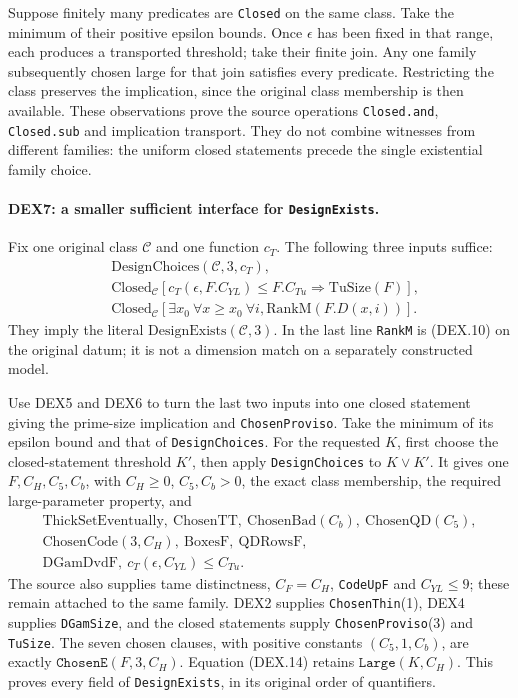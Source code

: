 \documentclass[11pt,a4paper]{article}
\numberwithin{equation}{section}
\theoremstyle{remark}\newtheorem{remark}[theorem]{Remark}
\begin{document}
Suppose finitely many predicates are \texttt{Closed} on the same
class. Take the minimum of their positive epsilon bounds. Once
$\epsilon$ has been fixed in that range, each produces a transported
threshold; take their finite join. Any one family subsequently chosen
large for that join satisfies every predicate. Restricting the class
preserves the implication, since the original class membership is
then available. These observations prove the source operations
\texttt{Closed.and}, \texttt{Closed.sub} and implication transport.
They do not combine witnesses from different families: the uniform
closed statements precede the single existential family choice.

\paragraph{DEX7: a smaller sufficient interface for \texttt{DesignExists}.}
\label{claim:DEX7}
Fix one original class $\mathcal C$ and one function $c_T$.
The following three inputs suffice:
\[
\begin{split}
 &\mathrm{DesignChoices}(\mathcal C,3,c_T),\\
 &\mathrm{Closed}_{\mathcal C}
    [c_T(\epsilon,F.C_{YL})\le F.C_{Tu}\Rightarrow\mathrm{TuSize}(F)],\\
 &\mathrm{Closed}_{\mathcal C}
    [\exists x_0\ \forall x\ge x_0\ \forall i,
                                   \mathrm{RankM}(F.D(x,i))].
\end{split}
                                                               \tag{DEX.15}
\]
They imply the literal $\mathrm{DesignExists}(\mathcal C,3)$.
In the last line \texttt{RankM} is (DEX.10) on the original datum;
it is not a dimension match on a separately constructed model.

Use DEX5 and DEX6 to turn the last two inputs into one closed statement
giving the prime-size implication and \texttt{ChosenProviso}.
Take the minimum of its epsilon bound and that of
\texttt{DesignChoices}. For the requested $K$, first choose the
closed-statement threshold $K'$, then apply \texttt{DesignChoices}
to $K\vee K'$. It gives one $F,C_H,C_5,C_b$, with $C_H\ge0$,
$C_5,C_b>0$, the exact class membership, the required large-parameter
property, and
\[
 \begin{gathered}
 \mathrm{ThickSetEventually},\ \mathrm{ChosenTT},\
 \mathrm{ChosenBad}(C_b),\ \mathrm{ChosenQD}(C_5),\\
 \mathrm{ChosenCode}(3,C_H),\ \mathrm{BoxesF},\ \mathrm{QDRowsF},\\
 \mathrm{DGamDvdF},\ c_T(\epsilon,C_{YL})\le C_{Tu}.
 \end{gathered}
\]
The source also supplies tame distinctness, $C_F=C_H$,
\texttt{CodeUpF} and $C_{YL}\le9$; these remain attached to the same
family. DEX2 supplies \texttt{ChosenThin}(1), DEX4 supplies
\texttt{DGamSize}, and the closed statements supply
\texttt{ChosenProviso}(3) and \texttt{TuSize}.
The seven chosen clauses, with positive constants $(C_5,1,C_b)$,
are exactly $\texttt{ChosenE}(F,3,C_H)$. Equation (DEX.14) retains
$\texttt{Large}(K,C_H)$. This proves every field of
\texttt{DesignExists}, in its original order of quantifiers.
\end{document}
